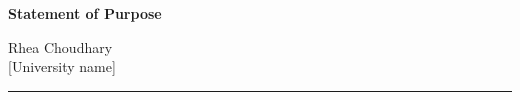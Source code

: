 \documentclass[11pt]{article}
\newcommand{\school}{[University name]}
\begin{document}
\noindent
\begin{minipage}[t]{0.60\textwidth}
  {\large\bfseries Statement of Purpose}
\end{minipage}\hfill
\begin{minipage}[t]{0.38\textwidth}
  \raggedleft
  Rhea Choudhary\\[2pt]
  \school
\end{minipage}

\vspace{0.5em}
\noindent\rule{\textwidth}{0.8pt}

\vspace{1.1em}




\end{document}

